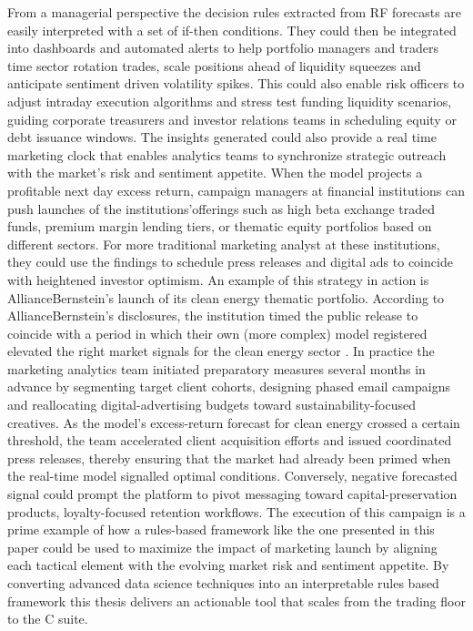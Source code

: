 From a managerial perspective the decision rules extracted from RF forecasts are easily interpreted with a set of if-then conditions. They could then be integrated into dashboards and automated alerts to help portfolio managers and traders time sector rotation trades, scale positions ahead of liquidity squeezes and anticipate sentiment driven volatility spikes. This could also enable risk officers to adjust intraday execution algorithms and stress test funding liquidity scenarios, guiding corporate treasurers and investor relations teams in scheduling equity or debt issuance windows. The insights generated could also provide a real time marketing clock that enables analytics teams to synchronize strategic outreach with the market's risk and sentiment appetite. When the model projects a profitable next day excess return, campaign managers at financial institutions can push launches of the institutions'offerings such as high beta exchange traded funds, premium margin lending tiers, or thematic equity portfolios based on different sectors. For more traditional marketing analyst at these institutions, they could use the findings to schedule press releases and digital ads to coincide with heightened investor optimism. An example of this strategy in action is AllianceBernstein's launch of its clean energy thematic portfolio. According to AllianceBernstein's disclosures, the institution timed the public release to coincide with a period in which their own (more complex) model registered elevated the right market signals for the clean energy sector \cite{alliance_2024}. In practice the marketing analytics team initiated preparatory measures several months in advance by segmenting target client cohorts, designing phased email campaigns and reallocating digital-advertising budgets toward sustainability-focused creatives. As the model's excess-return forecast for clean energy crossed a certain threshold, the team accelerated client acquisition efforts and issued coordinated press releases, thereby ensuring that the market had already been primed when the real-time model signalled optimal conditions. Conversely, negative forecasted signal could prompt the platform to pivot messaging toward capital-preservation products, loyalty-focused retention workflows. The execution of this campaign is a prime example of how a rules-based framework like the one presented in this paper could be used to maximize the impact of marketing launch by aligning each tactical element with the evolving market risk and sentiment appetite. By converting advanced data science techniques into an interpretable rules based framework this thesis delivers an actionable tool that scales from the trading floor to the C suite.

